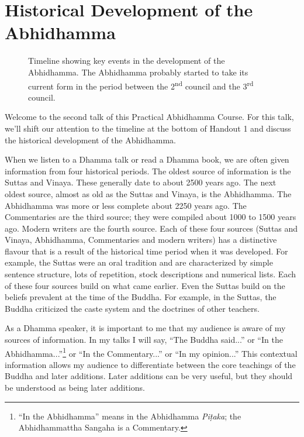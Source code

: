 \section{Historical Development of the Abhidhamma}

\begin{figure}[h]
\centering

\caption{Timeline showing key events in the development of the Abhidhamma. The Abhidhamma probably started to take its current form in the period between the 2\textsuperscript{nd} council and the 3\textsuperscript{rd} council.}
\label{fig:Timeline}
\end{figure}

Welcome to the second talk of this Practical Abhidhamma Course. For this talk, we’ll shift our attention to the timeline at the bottom of Handout 1 and discuss the historical development of the Abhidhamma.

When we listen to a Dhamma talk or read a Dhamma book, we are often given information from four historical periods. The oldest source of information is the Suttas and Vinaya. These generally date to about 2500 years ago. The next oldest source, almost as old as the Suttas and Vinaya, is the Abhidhamma. The Abhidhamma was more or less complete about 2250 years ago. The Commentaries are the third source; they were compiled about 1000 to 1500 years ago. Modern writers are the fourth source. Each of these four sources (Suttas and Vinaya, Abhidhamma, Commentaries and modern writers) has a distinctive flavour that is a result of the historical time period when it was developed. For example, the Suttas were an oral tradition and are characterized by simple sentence structure, lots of repetition, stock descriptions and numerical lists. Each of these four sources build on what came earlier. Even the Suttas build on the beliefs prevalent at the time of the Buddha. For example, in the Suttas, the Buddha criticized the caste system and the doctrines of other teachers. 

As a Dhamma speaker, it is important to me that my audience is aware of my sources of information. In my talks I will say, “The Buddha said...” or “In the Abhidhamma...”\footnote{“In the Abhidhamma” means in the Abhidhamma \textit{Piṭaka}; the Abhidhammattha Sangaha is a Commentary.} or “In the Commentary...” or “In my opinion...” This contextual information allows my audience to differentiate between the core teachings of the Buddha and later additions. Later additions can be very useful, but they should be understood as being later additions.

